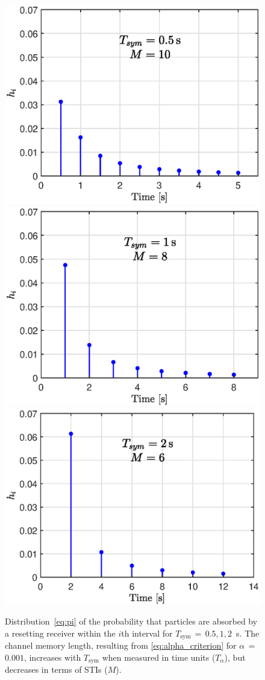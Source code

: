 \documentclass[journal]{IEEEtranTCOM}
\begin{document}
\begin{figure}[htp]
    \centering
    \includegraphics[width=.325\textwidth]{Figures/pi_a.eps}
    \includegraphics[width=.325\textwidth]{Figures/pi_b.eps}
    \includegraphics[width=.325\textwidth]{Figures/pi_c.eps}
    \caption{Distribution~\eqref{eq:pi} of the probability that particles are absorbed by a resetting receiver within the $i$th interval for $T_{\mathrm{sym}}$$\,=\,$$0.5, 1, 2$~s. The channel memory length, resulting from \eqref{eq:alpha_criterion} for $\alpha$$\,=\,$$0.001$, increases with $T_{\mathrm{sym}}$ when measured in time units ($T_{\alpha}$), but decreases in terms of STIs ($M$).}
    \label{fig:alpha_memory}
\end{figure}
\end{document}
